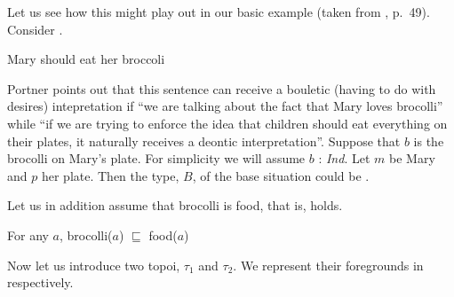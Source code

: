 Let us see how this might play out in our basic example (taken from
\citealp{Portner2009}, p.~49). Consider \nexteg{}.
\begin{ex} 
Mary should eat her broccoli 
\end{ex} 
Portner points out that this sentence can receive a bouletic (having
to do with desires)
intepretation if ``we are talking about the fact that Mary loves
brocolli'' while ``if we are trying to enforce the idea that children
should eat everything on their plates, it naturally receives a deontic
interpretation''.  Suppose that $b$ is the brocolli on Mary's plate.
For simplicity we will assume $b$ : \textit{Ind}.  Let $m$ be Mary and
$p$ her plate.  Then the type, $B$, of the base situation could be
\nexteg{}.
\begin{ex} 
\label{ex:brocolli-on-plate}
\end{ex} 
Let us in addition assume that brocolli is food, that is, \nexteg{}
holds.
\begin{ex} 
For any $a$, brocolli($a$) $\sqsubseteq$ food($a$) 
\label{ex:brocolli-food}
\end{ex} 
Now let us introduce two topoi, $\tau_1$ and $\tau_2$.  We represent
their foregrounds in  respectively.
